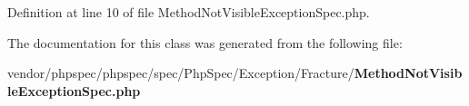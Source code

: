 Definition at line 10 of file Method\+Not\+Visible\+Exception\+Spec.\+php.



The documentation for this class was generated from the following file\+:\begin{DoxyCompactItemize}
\item 
vendor/phpspec/phpspec/spec/\+Php\+Spec/\+Exception/\+Fracture/{\bf Method\+Not\+Visible\+Exception\+Spec.\+php}\end{DoxyCompactItemize}
